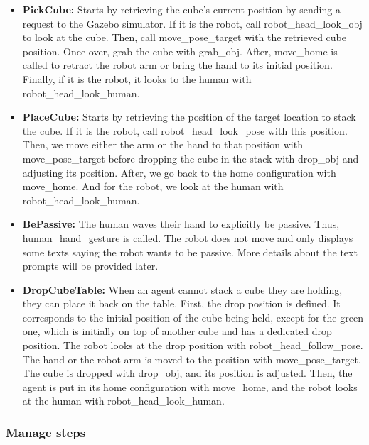 \begin{itemize}
    \item \textbf{PickCube:}            Starts by retrieving the cube's current position by sending a request to the Gazebo simulator. If it is the robot, call robot\_head\_look\_obj to look at the cube. Then, call move\_pose\_target with the retrieved cube position. Once over, grab the cube with grab\_obj. After, move\_home is called to retract the robot arm or bring the hand to its initial position. Finally, if it is the robot, it looks to the human with robot\_head\_look\_human.
    
    \item \textbf{PlaceCube:}           Starts by retrieving the position of the target location to stack the cube. If it is the robot, call robot\_head\_look\_pose with this position. Then, we move either the arm or the hand to that position with move\_pose\_target before dropping the cube in the stack with drop\_obj and adjusting its position. After, we go back to the home configuration with move\_home. And for the robot, we look at the human with robot\_head\_look\_human. 
    
    \item \textbf{BePassive:}           The human waves their hand to explicitly be passive. Thus, human\_hand\_gesture is called. The robot does not move and only displays some texts saying the robot wants to be passive. More details about the text prompts will be provided later.
    
    \item \textbf{DropCubeTable:}       When an agent cannot stack a cube they are holding, they can place it back on the table. First, the drop position is defined. It corresponds to the initial position of the cube being held, except for the green one, which is initially on top of another cube and has a dedicated drop position. The robot looks at the drop position with robot\_head\_follow\_pose. The hand or the robot arm is moved to the position with move\_pose\_target. The cube is dropped with drop\_obj, and its position is adjusted. Then, the agent is put in its home configuration with move\_home, and the robot looks at the human with robot\_head\_look\_human.  
\end{itemize}

\subsubsection{Manage steps}

